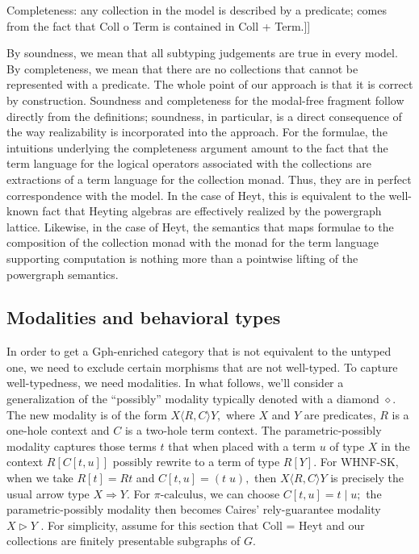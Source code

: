 \documentclass[submission,copyright,creativecommons]{eptcs}
\newcommand{\pic}{$\pi\mbox{-calculus}$\xspace}
\begin{document}
Completeness: any collection in the model is described by a predicate; comes from the fact that Coll o Term is contained in Coll + Term.]]

By soundness, we mean that all subtyping judgements are true in every model.  By completeness, we mean that there are no collections that cannot be represented with a predicate.  The whole point of our approach is that it is correct by construction.  Soundness and completeness for the modal-free fragment follow directly from the definitions; soundness, in particular, is a direct consequence of the way realizability is incorporated into the approach.  For the formulae, the intuitions underlying the completeness argument amount to the fact that the term language for the logical operators associated with the collections are extractions of a term language for the collection monad.  Thus, they are in perfect correspondence with the model.  In the case of Heyt, this is equivalent to the well-known fact that Heyting algebras are effectively realized by the powergraph lattice.  Likewise, in the case of Heyt, the semantics that maps formulae to the composition of the collection monad with the monad for the term language supporting computation is nothing more than a pointwise lifting of the powergraph semantics.   

\subsection{Modalities and behavioral types}

In order to get a Gph-enriched category that is not equivalent to the untyped one, we need to exclude certain morphisms that are not well-typed.  To capture well-typedness, we need modalities.  In what follows, we'll consider a generalization of the ``possibly'' modality typically denoted with a diamond $\diamond.$  The new modality is of the form $X\langle R, C \rangle Y,$ where $X$ and $Y$ are predicates, $R$ is a one-hole context and $C$ is a two-hole term context.  The parametric-possibly modality captures those terms $t$ that when placed with a term $u$ of type $X$ in the context $R[C[t, u]]$ possibly rewrite to a term of type $R[Y].$  For WHNF-SK, when we take $R[t] = Rt$ and $C[t,u] = (t\; u),$ then $X\langle R, C \rangle Y$ is precisely the usual arrow type $X \Rightarrow Y.$  For \pic, we can choose $C[t, u] = t\; |\; u;$ the parametric-possibly modality then becomes Caires' rely-guarantee modality $X \triangleright Y$ \cite{Caires}.  For simplicity, assume for this section that Coll = Heyt and our collections are finitely presentable subgraphs of $G.$
\end{document}

